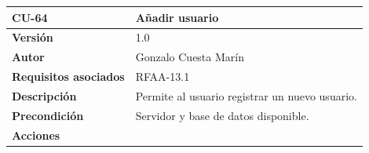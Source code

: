 \documentclass[
]{article}
\begin{document}
\begin{longtable}[]{@{}ll@{}}
\toprule
\begin{minipage}[b]{0.20\columnwidth}\raggedright
\textbf{CU-64}\strut
\end{minipage} & \begin{minipage}[b]{0.74\columnwidth}\raggedright
\textbf{Añadir usuario}\strut
\end{minipage}\tabularnewline
\midrule
\endhead
\begin{minipage}[t]{0.20\columnwidth}\raggedright
\textbf{Versión}\strut
\end{minipage} & \begin{minipage}[t]{0.74\columnwidth}\raggedright
1.0\strut
\end{minipage}\tabularnewline
\begin{minipage}[t]{0.20\columnwidth}\raggedright
\textbf{Autor}\strut
\end{minipage} & \begin{minipage}[t]{0.74\columnwidth}\raggedright
Gonzalo Cuesta Marín\strut
\end{minipage}\tabularnewline
\begin{minipage}[t]{0.20\columnwidth}\raggedright
\textbf{Requisitos asociados}\strut
\end{minipage} & \begin{minipage}[t]{0.74\columnwidth}\raggedright
RFAA-13.1\strut
\end{minipage}\tabularnewline
\begin{minipage}[t]{0.20\columnwidth}\raggedright
\textbf{Descripción}\strut
\end{minipage} & \begin{minipage}[t]{0.74\columnwidth}\raggedright
Permite al usuario registrar un nuevo usuario.\strut
\end{minipage}\tabularnewline
\begin{minipage}[t]{0.20\columnwidth}\raggedright
\textbf{Precondición}\strut
\end{minipage} & \begin{minipage}[t]{0.74\columnwidth}\raggedright
Servidor y base de datos disponible.\strut
\end{minipage}\tabularnewline
\begin{minipage}[t]{0.20\columnwidth}\raggedright
\textbf{Acciones}\strut
\end{minipage} & \begin{minipage}[t]{0.74\columnwidth}\raggedright
\begin{enumerate}
\def\labelenumi{\arabic{enumi}.}

\end{enumerate}
\end{minipage}
\end{longtable}
\end{document}
